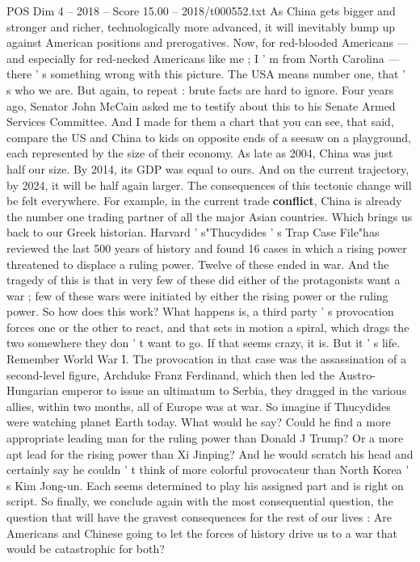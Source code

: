 \begin{textsample}{POS Dim 4 – 2018 – Score 15.00 – 2018/t000552.txt}
As China gets bigger and stronger and richer, technologically more advanced, it will inevitably bump up against American positions and prerogatives.
Now, for red-blooded Americans — and especially for red-necked Americans like me ; I ' m from North Carolina — there ' s something wrong with this picture.
The USA means number one, that ' s who we are.
But again, to repeat : brute facts are hard to ignore.
Four years ago, Senator John McCain asked me to testify about this to his Senate Armed Services Committee.
And I made for them a chart that you can see, that said, compare the US and China to kids on opposite ends of a seesaw on a playground, each represented by the size of their economy.
As late as 2004, China was just half our size.
By 2014, its GDP was equal to ours.
And on the current trajectory, by 2024, it will be half again larger.
The consequences of this tectonic change will be felt everywhere.
For example, in the current trade \textbf{conflict}, China is already the number one trading partner of all the major Asian countries.
Which brings us back to our Greek historian.
Harvard ' s"Thucydides ' s Trap Case File"has reviewed the last 500 years of history and found 16 cases in which a rising power threatened to displace a ruling power.
Twelve of these ended in war.
And the tragedy of this is that in very few of these did either of the protagonists want a war ; few of these wars were initiated by either the rising power or the ruling power.
So how does this work?
What happens is, a third party ' s provocation forces one or the other to react, and that sets in motion a spiral, which drags the two somewhere they don ' t want to go.
If that seems crazy, it is.
But it ' s life.
Remember World War I.
The provocation in that case was the assassination of a second-level figure, Archduke Franz Ferdinand, which then led the Austro- Hungarian emperor to issue an ultimatum to Serbia, they dragged in the various allies, within two months, all of Europe was at war.
So imagine if Thucydides were watching planet Earth today.
What would he say?
Could he find a more appropriate leading man for the ruling power than Donald J Trump?
Or a more apt lead for the rising power than Xi Jinping?
And he would scratch his head and certainly say he couldn ' t think of more colorful provocateur than North Korea ' s Kim Jong-un.
Each seems determined to play his assigned part and is right on script.
So finally, we conclude again with the most consequential question, the question that will have the gravest consequences for the rest of our lives : Are Americans and Chinese going to let the forces of history drive us to a war that would be catastrophic for both?

\end{textsample}
